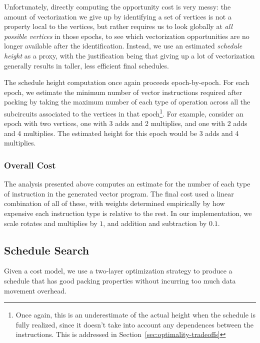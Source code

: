 Unfortunately, directly computing the opportunity cost is very messy: the amount of vectorization we give up by identifying a set of vertices is not a property local to the vertices, but rather requires us to look globally at {\em all possible vertices} in those epochs, to see which vectorization opportunities are no longer available after the identification.
Instead, we use an estimated {\em schedule height} as a proxy, with the justification being that giving up a lot of vectorization generally results in taller, less efficient final schedules. 

The schedule height computation once again proceeds epoch-by-epoch.
For each epoch, we estimate the minimum number of vector instructions required after packing by taking the maximum number of each type of operation across all the subcircuits associated to the vertices in that epoch\footnote{Once again, this is an underestimate of the actual height when the schedule is fully realized, since it doesn't take into account any dependences between the instructions. This is addressed in Section~\ref{sec:optimality-tradeoffs}}.
For example, consider an epoch with two vertices, one with 3 adds and 2 multiplies, and one with 2 adds and 4 multiplies.
The estimated height for this epoch would be 3 adds and 4 multiplies.

\subsubsection*{Overall Cost}
The analysis presented above computes an estimate for the number of each type of instruction in the generated vector program.
The final cost used a linear combination of all of these, with weights determined empirically by how expensive each instruction type is relative to the rest.
In our implementation, we scale rotates and multiplies by $1$, and addition and subtraction by $0.1$. 

\subsection{Schedule Search}
Given a cost model, we use a two-layer optimization strategy to produce a schedule that has good packing properties without incurring too much data movement overhead.
